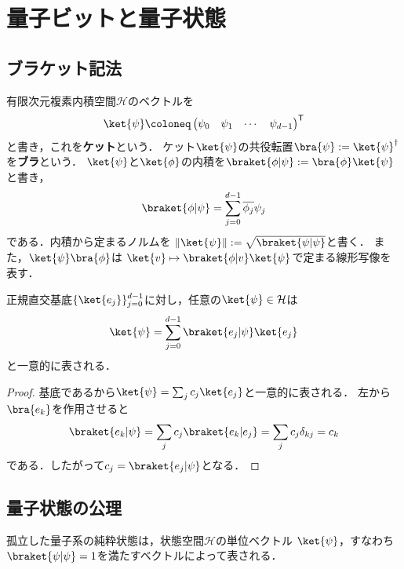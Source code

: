 \section{量子ビットと量子状態}
\label{sec:qubit-state}

\subsection{ブラケット記法}

有限次元複素内積空間$\mathcal H$のベクトルを
\begin{equation}
  \ket{\psi}
  \coloneq
  \begin{pmatrix}
    \psi_0&\psi_1&\cdots&\psi_{d-1}
  \end{pmatrix}^{\mathsf T}
  \label{eq:ket-coordinate}
\end{equation}
と書き，これを\textbf{ケット}という．
ケット$\ket{\psi}$の共役転置$\bra{\psi}:=\ket{\psi}^{\dagger}$を\textbf{ブラ}という．
$\ket{\psi}$と$\ket{\phi}$の内積を$\braket{\phi|\psi}:=\bra{\phi}\ket{\psi}$と書き，
\begin{equation}
  \braket{\phi|\psi}=\sum_{j=0}^{d-1}\overline{\phi_j}\psi_j
\end{equation}
である．内積から定まるノルムを
$\lVert\ket{\psi}\rVert:=\sqrt{\braket{\psi|\psi}}$と書く．
また，$\ket{\psi}\bra{\phi}$は
$\ket{v}\mapsto\braket{\phi|v}\ket{\psi}$で定まる線形写像を表す．

\begin{prop}
正規直交基底$\{\ket{e_j}\}_{j=0}^{d-1}$に対し，任意の$\ket{\psi}\in\mathcal H$は
\begin{equation}
  \ket{\psi}=\sum_{j=0}^{d-1}\braket{e_j|\psi}\ket{e_j}
  \label{eq:orthonormal-expansion}
\end{equation}
と一意的に表される．
\end{prop}
\begin{proof}
基底であるから$\ket{\psi}=\sum_j c_j\ket{e_j}$と一意的に表される．
左から$\bra{e_k}$を作用させると
\[
  \braket{e_k|\psi}
  =\sum_jc_j\braket{e_k|e_j}
  =\sum_jc_j\delta_{kj}=c_k
\]
である．したがって$c_j=\braket{e_j|\psi}$となる．
\end{proof}

\subsection{量子状態の公理}

\begin{defi}[純粋状態]
孤立した量子系の純粋状態は，状態空間$\mathcal H$の単位ベクトル
$\ket{\psi}$，すなわち$\braket{\psi|\psi}=1$を満たすベクトルによって表される．
\end{defi}

